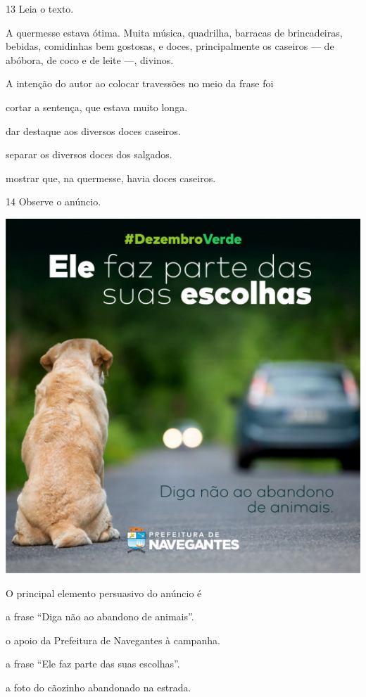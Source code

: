 \num{13} Leia o texto.

\begin{myquote}
A quermesse estava ótima. Muita música, quadrilha, barracas de
brincadeiras, bebidas, comidinhas bem gostosas, e doces, principalmente
os caseiros --- de abóbora, de coco e de leite ---, divinos.

\end{myquote}

A intenção do autor ao colocar travessões no meio da frase foi

\begin{escolha}
\item cortar a sentença, que estava muito longa.

\item dar destaque aos diversos doces caseiros.

\item separar os diversos doces dos salgados.

\item mostrar que, na quermesse, havia doces caseiros.
\end{escolha}

\pagebreak
\num{14} Observe o anúncio.
\vspace{2ex}

\begin{center}
\includegraphics[width=.6\textwidth]{./media/simulados/image6.png}
\end{center}

O principal elemento persuasivo do anúncio é

\begin{escolha}
\item a frase ``Diga não ao abandono de animais''.

\item o apoio da Prefeitura de Navegantes à campanha.

\item a frase ``Ele faz parte das suas escolhas''.

\item a foto do cãozinho abandonado na estrada.
\end{escolha}


